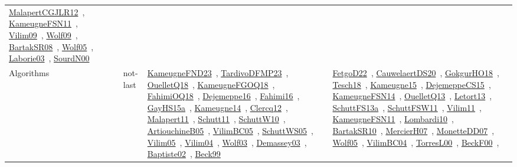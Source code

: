 {\begin{longtable}{lp{3cm}>{\raggedright\arraybackslash}p{6cm}>{\raggedright\arraybackslash}p{6cm}>{\raggedright\arraybackslash}p{8cm}}
\href{../works/MalapertCGJLR12.pdf}{MalapertCGJLR12}~\cite{MalapertCGJLR12}, \href{../works/KameugneFSN11.pdf}{KameugneFSN11}~\cite{KameugneFSN11}, \href{../works/Vilim09.pdf}{Vilim09}~\cite{Vilim09}, \href{../works/Wolf09.pdf}{Wolf09}~\cite{Wolf09}, \href{../works/BartakSR08.pdf}{BartakSR08}~\cite{BartakSR08}, \href{../works/Wolf05.pdf}{Wolf05}~\cite{Wolf05}, \href{../works/Laborie03.pdf}{Laborie03}~\cite{Laborie03}, \href{../works/SourdN00.pdf}{SourdN00}~\cite{SourdN00}\\
Algorithms & not-last & \href{../works/KameugneFND23.pdf}{KameugneFND23}~\cite{KameugneFND23}, \href{../works/TardivoDFMP23.pdf}{TardivoDFMP23}~\cite{TardivoDFMP23}, \href{../works/OuelletQ18.pdf}{OuelletQ18}~\cite{OuelletQ18}, \href{../works/KameugneFGOQ18.pdf}{KameugneFGOQ18}~\cite{KameugneFGOQ18}, \href{../works/FahimiOQ18.pdf}{FahimiOQ18}~\cite{FahimiOQ18}, \href{../works/Dejemeppe16.pdf}{Dejemeppe16}~\cite{Dejemeppe16}, \href{../works/Fahimi16.pdf}{Fahimi16}~\cite{Fahimi16}, \href{../works/GayHS15a.pdf}{GayHS15a}~\cite{GayHS15a}, \href{../works/Kameugne14.pdf}{Kameugne14}~\cite{Kameugne14}, \href{../works/Clercq12.pdf}{Clercq12}~\cite{Clercq12}, \href{../works/Malapert11.pdf}{Malapert11}~\cite{Malapert11}, \href{../works/Schutt11.pdf}{Schutt11}~\cite{Schutt11}, \href{../works/SchuttW10.pdf}{SchuttW10}~\cite{SchuttW10}, \href{../works/ArtiouchineB05.pdf}{ArtiouchineB05}~\cite{ArtiouchineB05}, \href{../works/VilimBC05.pdf}{VilimBC05}~\cite{VilimBC05}, \href{../works/SchuttWS05.pdf}{SchuttWS05}~\cite{SchuttWS05}, \href{../works/Vilim05.pdf}{Vilim05}~\cite{Vilim05}, \href{../works/Vilim04.pdf}{Vilim04}~\cite{Vilim04}, \href{../works/Wolf03.pdf}{Wolf03}~\cite{Wolf03}, \href{../works/Demassey03.pdf}{Demassey03}~\cite{Demassey03}, \href{../works/Baptiste02.pdf}{Baptiste02}~\cite{Baptiste02}, \href{../works/Beck99.pdf}{Beck99}~\cite{Beck99} & \href{../works/FetgoD22.pdf}{FetgoD22}~\cite{FetgoD22}, \href{../works/CauwelaertDS20.pdf}{CauwelaertDS20}~\cite{CauwelaertDS20}, \href{../works/GokgurHO18.pdf}{GokgurHO18}~\cite{GokgurHO18}, \href{../works/Tesch18.pdf}{Tesch18}~\cite{Tesch18}, \href{../works/Kameugne15.pdf}{Kameugne15}~\cite{Kameugne15}, \href{../works/DejemeppeCS15.pdf}{DejemeppeCS15}~\cite{DejemeppeCS15}, \href{../works/KameugneFSN14.pdf}{KameugneFSN14}~\cite{KameugneFSN14}, \href{../works/OuelletQ13.pdf}{OuelletQ13}~\cite{OuelletQ13}, \href{../works/Letort13.pdf}{Letort13}~\cite{Letort13}, \href{../works/SchuttFS13a.pdf}{SchuttFS13a}~\cite{SchuttFS13a}, \href{../works/SchuttFSW11.pdf}{SchuttFSW11}~\cite{SchuttFSW11}, \href{../works/Vilim11.pdf}{Vilim11}~\cite{Vilim11}, \href{../works/KameugneFSN11.pdf}{KameugneFSN11}~\cite{KameugneFSN11}, \href{../works/Lombardi10.pdf}{Lombardi10}~\cite{Lombardi10}, \href{../works/BartakSR10.pdf}{BartakSR10}~\cite{BartakSR10}, \href{../works/MercierH07.pdf}{MercierH07}~\cite{MercierH07}, \href{../works/MonetteDD07.pdf}{MonetteDD07}~\cite{MonetteDD07}, \href{../works/Wolf05.pdf}{Wolf05}~\cite{Wolf05}, \href{../works/VilimBC04.pdf}{VilimBC04}~\cite{VilimBC04}, \href{../works/TorresL00.pdf}{TorresL00}~\cite{TorresL00}, \href{../works/BeckF00.pdf}{BeckF00}~\cite{BeckF00}, 
\end{longtable}}
